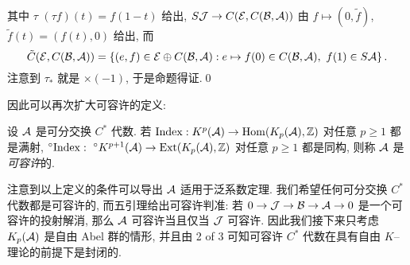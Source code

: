 \begin{Proof}
\begin{center}
	\end{center}
	其中 $ \tau $  $ (\tau f)(t)=f(1-t) $ 给出, $ S\mathcal{J}\to C(\mathcal{E},C(\mathcal{B},\mathcal{A})) $ 由 $ f\mapsto(0,\tilde{f}) $, $ \tilde{f}(t)=(f(t),0) $ 给出, 而
	\[
		\tilde{C}(\mathcal{E},C(\mathcal{B},\mathcal{A}))=\left\{ (e,f)\in\mathcal{E}\oplus C(\mathcal{B},\mathcal{A}) : e\mapsto f(0)\in C(\mathcal{B},\mathcal{A}),\ f(1)\in S\mathcal{A} \right\}.
	\]
	注意到 $ \tau_* $ 就是 $ \times(-1) $, 于是命题得证.\qed
\end{Proof}

因此可以再次扩大可容许的定义:

\begin{Definition}[可容许, 推广]
	设 $ \mathcal{A} $ 是可分交换 $ C^* $ 代数. 若 $ \mathrm{Index} : K^p(\mathcal{A})\to\mathrm{Hom}(K_p(\mathcal{A}),\mathbb{Z}) $ 对任意 $ p\geqslant 1 $ 都是满射, $ ^\circ\mathrm{Index} : \ ^\circ K^{p+1}(\mathcal{A})\to\mathrm{Ext}(K_p(\mathcal{A}),\mathbb{Z}) $ 对任意 $ p\geqslant 1 $ 都是同构, 则称 $ \mathcal{A} $ 是\emph{可容许}的.
\end{Definition}

注意到以上定义的条件可以导出 $ \mathcal{A} $ 适用于泛系数定理. 我们希望任何可分交换 $ C^* $ 代数都是可容许的, 而五引理给出可容许判准: 若 $ 0\to\mathcal{J}\to\mathcal{B}\to\mathcal{A}\to 0 $ 是一个可容许的投射解消, 那么 $ \mathcal{A} $ 可容许当且仅当 $ \mathcal{J} $ 可容许. 因此我们接下来只考虑 $ K_p(\mathcal{A}) $ 是自由 Abel 群的情形, 并且由 2 of 3 可知可容许 $ C^* $ 代数在具有自由 $ K $--理论的前提下是封闭的.

